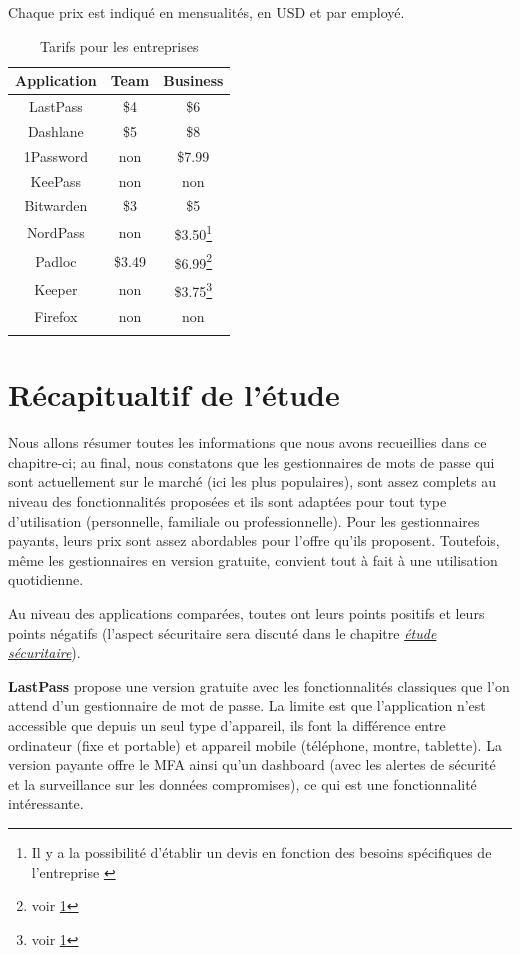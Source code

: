 Chaque prix est indiqué en mensualités, en USD et par employé.
\begin{longtable}[h]{|c|c|c|}
	\hline
	Application & Team & Business \\
	\hline
	LastPass & \$4 & \$6  \\
	\hline
	Dashlane & \$5 & \$8 \\
	\hline
	1Password & non  & \$7.99  \\
	\hline
	KeePass & non & non \\
	\hline
	Bitwarden & \$3 & \$5  \\
	\hline
	NordPass & non & \$3.50\footnote{Il y a la possibilité d'établir un devis en fonction des besoins spécifiques de l'entreprise \label{premium}} \\
	\hline
	Padloc & \$3.49 & \$6.99\footnote{voir \ref{premium}} \\
	\hline
	Keeper & non & \$3.75\footnote{voir \ref{premium}}  \\
	\hline
	Firefox & non & non \\
    \hline
	\caption{Tarifs pour les entreprises}
\end{longtable}

\section{Récapitualtif de l'étude}
Nous allons résumer toutes les informations que nous avons recueillies dans ce chapitre-ci; au final, nous constatons que les gestionnaires de mots de passe qui sont actuellement sur le marché (ici les plus populaires), sont assez complets au niveau des fonctionnalités proposées et ils sont adaptées pour tout type d'utilisation (personnelle, familiale ou professionnelle). Pour les gestionnaires payants, leurs prix sont assez abordables pour l'offre qu'ils proposent. Toutefois, même les gestionnaires en version gratuite, convient tout à fait à une utilisation quotidienne.

Au niveau des applications comparées, toutes ont leurs points positifs et leurs points négatifs (l'aspect sécuritaire sera discuté dans le chapitre \hyperref[ch:etude_secu]{\textit{étude sécuritaire}}). 

\textbf{LastPass} propose une version gratuite avec les fonctionnalités classiques que l'on attend d'un gestionnaire de mot de passe. La limite est que l'application n'est accessible que depuis un seul type d'appareil, ils font la différence entre ordinateur (fixe et portable) et appareil mobile (téléphone, montre, tablette). La version payante offre le MFA ainsi qu'un dashboard (avec les alertes de sécurité et la surveillance sur les données compromises), ce qui est une fonctionnalité intéressante.

